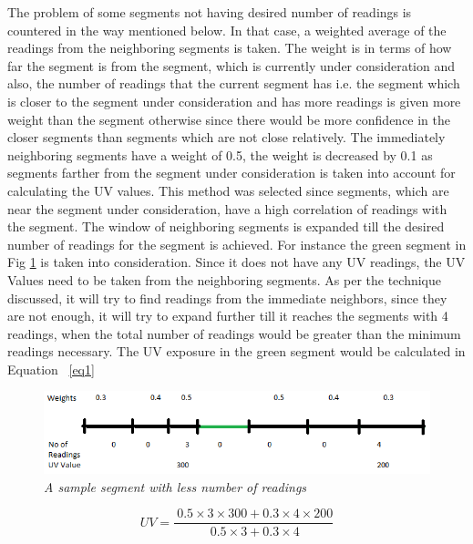\documentclass[12pt,fullpage,doublespace]{article}
\begin{document}
The problem of some segments not having desired number of readings is countered in the way mentioned below. In that case, a weighted average of the readings from the neighboring segments is taken. The weight is in terms of how far the segment is from the segment, which is currently under consideration and also, the number of readings that the current segment has i.e. the segment which is closer to the segment under consideration and has more readings is given more weight than the segment otherwise since there would be more confidence in the closer segments than segments which are not close relatively. The immediately neighboring segments have a weight of 0.5, the weight is decreased by 0.1 as segments farther from the segment under consideration is taken into account for calculating the UV values. This method was selected since segments, which are near the segment under consideration, have a high correlation of readings with the segment. The window of neighboring segments is expanded till the desired number of readings for the segment is achieved. For instance the green segment in Fig \ref{fig:segmentLessReadings} is taken into consideration. Since it does not have any UV readings, the UV Values need to be taken from the neighboring segments. As per the technique discussed, it will try to find readings from the immediate neighbors, since they are not enough, it will try to expand further till it reaches the segments with 4 readings, when the total number of readings would be greater than the minimum readings necessary. The UV exposure in the green segment would be calculated in Equation ~\ref{eq1}
\begin{figure}[h]
\begin{center}
\includegraphics[scale=0.4]{segmentLessReadings.png}
\caption{\small \sl A sample segment with less number of readings}
\label{fig:segmentLessReadings}
\end{center}
\end{figure}

\begin{equation}
\label{eq1}
UV=\frac{\ 0.5 \times 3 \times 300+ 0.3 \times 4 \times 200}{\ 0.5 \times 3+0.3 \times 4}
\end{equation}\\
\end{document}
